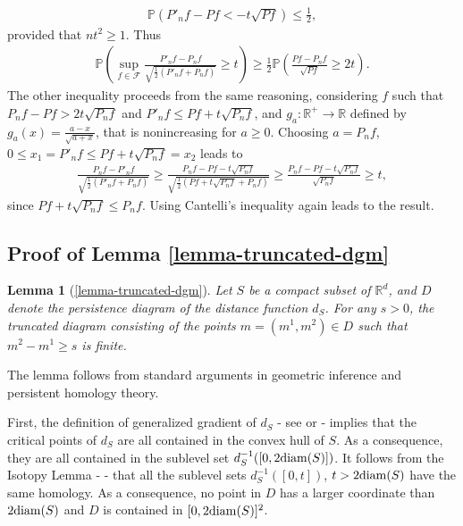 \documentclass[noinfoline,preprint]{article}
\newtheorem*{lem*}{Lemma}
\newcommand{\R}{\mathbb{R}}
\renewcommand{\1}{\mathds 1}
\begin{document}
\begin{align*}
\mathbb{P} \left ( P'_nf - Pf < -t \sqrt{Pf} \right ) \leq \frac{1}{2},
\end{align*}
provided that $nt^2 \geq 1$. Thus
\begin{align*}
\mathbb{P} \left ( \sup_{f \in \mathcal{F}} \frac{P'_nf - P_nf }{\sqrt{\frac{1}{2}( P'_nf + P_nf)}} \geq t \right ) \geq \frac{1}{2} \mathbb{P} \left ( \frac{Pf - P_nf}{\sqrt{Pf}} \geq 2t \right ).
\end{align*}
The other inequality proceeds from the same reasoning, considering $f$ such that $P_nf - Pf > 2t \sqrt{P_nf}$ and $P'_nf \leq Pf + t \sqrt{P_nf}$, and $g_a: \mathbb{R}^+ \rightarrow \mathbb{R}$ defined by $g_a(x) = \frac{a-x}{\sqrt{a+x}}$, that is nonincreasing for $a \geq 0$. Choosing $a = P_nf$, $0 \leq x_1 = P'_nf \leq Pf + t \sqrt{
P_nf} = x_2$ leads to
\begin{align*}
\frac{P_nf - P'_nf}{\sqrt{\frac{1}{2} \left ( P'_nf + P_nf \right )}} \geq \frac{P_nf - Pf - t \sqrt{P_nf}}{\sqrt{\frac{1}{2} \left ( Pf + t \sqrt{P_nf} + P_nf\right ) } } \geq \frac{P_nf - Pf - t \sqrt{P_nf}}{\sqrt{P_nf}} \geq t,
\end{align*}
since $Pf + t \sqrt{P_nf} \leq P_nf$. Using Cantelli's inequality again leads to the result.

\subsection{Proof of Lemma \ref{lemma-truncated-dgm}}\label{sec:proof_lemma_truncated_dgm}
\begin{lem*}[\ref{lemma-truncated-dgm}]
Let $S$ be a compact subset of $\R^d$, and $D$ denote the persistence diagram of the distance function $d_S$. For any $s >0$, the truncated diagram consisting of the points $m=(m^1, m^2) \in D$ such that $m^2 - m^1 \geq s$ is finite.    
\end{lem*}
The lemma follows from standard arguments in geometric inference and persistent homology theory. 
  
First, the definition of generalized gradient of $d_S$ - see \cite{chazal2009sampling} or \cite[Section 9.2]{boissonnat2018geometric}  - implies that the critical points of $d_S$ are all contained in the convex hull of $S$. As a consequence, they are all contained in the sublevel set $d_S^{-1}([0, 2{\rm diam}(S)])$. It follows from the Isotopy Lemma - \cite[Theorem 9.5]{boissonnat2018geometric}  - that all the sublevel sets $d_S^{-1}([0, t])$, $t > 2{\rm diam}(S)$ have the same homology.  As a consequence, no point in $D$ has a larger coordinate than $2{\rm diam}(S)$ and $D$ is contained in $[0,2{\rm diam}(S)]^2$. 
             
\end{document}
